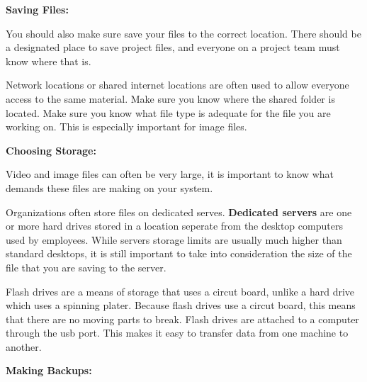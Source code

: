 \documentclass{report}
\begin{document}
    \bigbreak \noindent 
    
    \bigbreak \noindent 
    \begin{Large}
        \textbf{Saving Files:}
    \end{Large}

    \bigbreak \noindent 
    You should also make sure save your files to the correct location. There should be a designated place to save project files, and everyone on a project
    team must know where that is.

    \bigbreak \noindent 
    Network locations or shared internet locations are often used to allow everyone
    access to the same material. Make sure you know where the shared folder is located. 
    Make sure you know what file type is adequate for the file you are working on. This is 
    especially important for image files. 

    \bigbreak \noindent 

    \bigbreak \noindent 
    \begin{Large}
        \textbf{Choosing Storage:}
    \end{Large}

    \bigbreak \noindent 
    Video and image files can often be very large, it is important to know
    what demands these files are making on your system.

    \bigbreak \noindent 
    Organizations often store files on dedicated serves. \textbf{Dedicated servers} are 
    one or more hard drives stored in a location seperate from the desktop computers used by 
    employees. While servers storage limits are usually much higher than standard desktops, 
    it is still important to take into consideration the size of the file that you are saving
    to the server.

    \bigbreak \noindent 

    \bigbreak \noindent 
    Flash drives are a means of storage that uses a circut board, unlike a hard drive 
    which uses a spinning plater. Because flash drives use a circut board, this means that there
    are no moving parts to break. Flash drives are attached to a computer through the usb port.
    This makes it easy to transfer data from one machine to another. 

    \bigbreak \noindent 
    \begin{Large}
        \textbf{Making Backups:}
    \end{Large}
\end{document}
